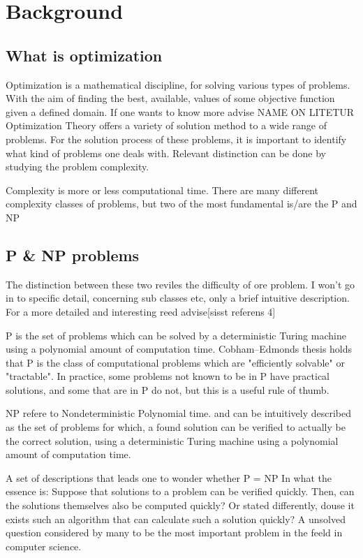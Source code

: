 \section{Background}

\subsection{What is optimization}

Optimization is a mathematical discipline, for solving various types of problems. With the aim of finding the best, available, values of some objective function given a defined domain. If one wants to know more advise NAME ON LITETUR\\

Optimization Theory offers a variety of solution method to a wide range of problems. For the solution process of these problems, it is important to identify what kind of problems one deals with.
Relevant distinction can be done by studying the problem complexity.

Complexity is more or less computational time. There are many different complexity classes of problems, but two of the most fundamental is/are the P and NP

\subsection{P \& NP problems}

The distinction between these two reviles the difficulty of ore problem. I won’t go in to specific detail, concerning sub classes etc, only a brief intuitive description.
For a more detailed and interesting reed advise[sisst referens 4]

P is the set of problems which can be solved by a deterministic Turing machine using a polynomial amount of computation time.
Cobham–Edmonds thesis holds that P is the class of computational problems which are "efficiently solvable" or "tractable". In practice, some problems not known to be in P have practical solutions, and some that are in P do not, but this is a useful rule of thumb.

NP refere to Nondeterministic Polynomial time. and can be intuitively described as the set of problems for which, a found solution can be verified to actually be the correct solution, using a deterministic Turing machine using a polynomial amount of computation time.

A set of descriptions that leads one to wonder whether
P = NP
In what the essence is:
Suppose that solutions to a problem can be verified quickly. Then, can the solutions themselves also be computed quickly?
Or stated differently, douse it exists such an algorithm that can calculate such a solution quickly?
A unsolved question considered by many to be the most important problem in the feeld in computer science. 

